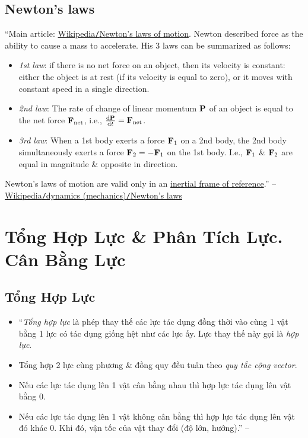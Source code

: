 \documentclass{article}
\begin{document}
\subsection{Newton's laws}
``Main article: \href{https://en.wikipedia.org/wiki/Newton%27s_laws_of_motion}{Wikipedia\texttt{/}Newton's laws of motion}. Newton described force as the ability to cause a mass to accelerate. His 3 laws can be summarized as follows:
\begin{itemize}
	\item {\it 1st law}: if there is no net force on an object, then its velocity is constant: either the object is at rest (if its velocity is equal to zero), or it moves with constant speed in a single direction.
	\item {\it 2nd law}: The rate of change of linear momentum ${\bf P}$ of an object is equal to the net force ${\bf F}_{\rm net}$, i.e., $\frac{{\rm d}{\bf P}}{{\rm d}t} = {\bf F}_{\rm net}$.
	\item {\it 3rd law}: When a 1st body exerts a force ${\bf F}_1$ on a 2nd body, the 2nd body simultaneously exerts a force ${\bf F}_2 = -{\bf F}_1$ on the 1st body. I.e., ${\bf F}_1$ \& ${\bf F}_2$ are equal in magnitude \& opposite in direction.
\end{itemize}
Newton's laws of motion are valid only in an \href{https://en.wikipedia.org/wiki/Inertial_frame_of_reference}{inertial frame of reference}.'' -- \href{https://en.wikipedia.org/wiki/Dynamics_(mechanics)#Newton's_laws}{Wikipedia\texttt{/}dynamics (mechanics)\texttt{/}Newton's laws}


\section{Tổng Hợp Lực \& Phân Tích Lực. Cân Bằng Lực}

\subsection{Tổng Hợp Lực}
\begin{itemize}
	\item ``{\it Tổng hợp lực} là phép thay thế các lực tác dụng đồng thời vào cùng 1 vật bằng 1 lực có tác dụng giống hệt như các lực ấy. Lực thay thế này gọi là {\it hợp lực}.
	\item Tổng hợp 2 lực cùng phương \& đồng quy đều tuân theo {\it quy tắc cộng vector}.
	\item Nếu các lực tác dụng lên 1 vật cân bằng nhau thì hợp lực tác dụng lên vật bằng $0$.
	\item Nếu các lực tác dụng lên 1 vật không cân bằng thì hợp lực tác dụng lên vật đó khác $0$. Khi đó, vận tốc của vật thay đổi (độ lớn, hướng).'' -- \cite[Chủ đề II: {\it Động Lực Học}, p. 19]{Giang_Hang_Trung_ncpt_Vat_Ly_10}
\end{itemize}
\end{document}
